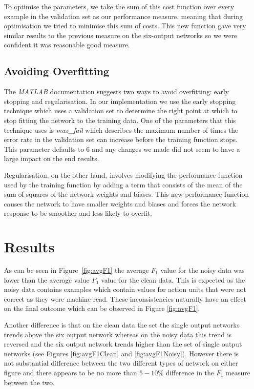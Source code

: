 \documentclass[10pt,a4paper]{article}
\begin{document}
To optimise the parameters, we take the sum of this cost function over every example in the validation set as our performance measure, meaning that during optimisation we tried to minimise this sum of costs. This new function gave very similar results to the previous measure on the six-output networks so we were confident it was reasonable good measure.

\subsection{Avoiding Overfitting}
The \emph{MATLAB} documentation suggests two ways to avoid overfitting: early stopping and regularisation. In our implementation we use the early stopping technique which uses a validation set to determine the right point at which to stop fitting the network to the training data. One of the parameters that this technique uses is \emph{max\_fail} which describes the maximum number of times the error rate in the validation set can increase before the training function stops. This parameter defaults to 6 and any changes we made did not seem to have a large impact on the end results.

Regularisation, on the other hand, involves modifying the performance function used by the training function by adding a term that consists of the mean of the sum of squares of the network weights and biases. This new performance function causes the network to have smaller weights and biases and forces the network response to be smoother and less likely to overfit.

\section{Results}

As can be seen in Figure~\ref{fig:avgF1} the average $F_1$ value for the noisy data was lower than the average value $F_1$ value for the clean data. This is expected as the noisy data contains examples which contain values for action units that were not correct as they were machine-read. These inconsistencies naturally have an effect on the final outcome which can be observed in Figure \ref{fig:avgF1}.

Another difference is that on the clean data the set the single output networks trends above the six output network whereas on the noisy data this trend is reversed and the six output network trends higher than the set of single output networks (see Figures \ref{fig:avgF1Clean} and \ref{fig:avgF1Noisy}). However there is not substantial difference between the two different types of network on either figure and there appears to be no more than $5-10\%$ difference in the $F_1$ measure between the two.
\end{document}
